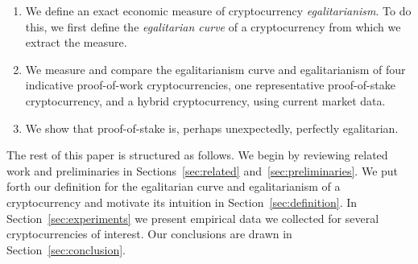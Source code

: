 \begin{enumerate}
  \item We define an exact economic measure of cryptocurrency
        \emph{egalitarianism}.
        To do this, we first define the \emph{egalitarian curve} of a
        cryptocurrency from which we extract the measure.
  \item We measure and compare the egalitarianism curve and egalitarianism of
        four indicative proof-of-work cryptocurrencies, one representative
        proof-of-stake cryptocurrency, and a hybrid cryptocurrency, using
        current market data.
  \item We show that proof-of-stake is, perhaps unexpectedly, perfectly
        egalitarian.
\end{enumerate}

The rest of this paper is structured as follows. We begin by reviewing related work and preliminaries in
Sections~\ref{sec:related} and~\ref{sec:preliminaries}. We put forth our definition for the egalitarian curve
and egalitarianism of a cryptocurrency and motivate its intuition in
Section~\ref{sec:definition}. In Section~\ref{sec:experiments} we present
empirical data we collected for several cryptocurrencies of interest.
Our conclusions are drawn in Section~\ref{sec:conclusion}.
